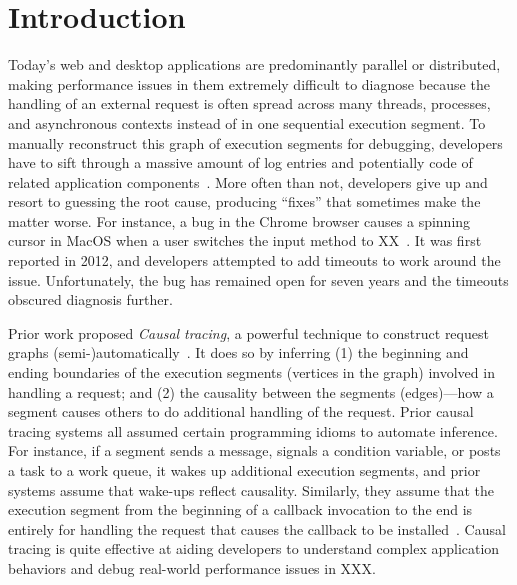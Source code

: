 \section{Introduction} \label{sec:intro}
%

%

Today's web and desktop applications are predominantly parallel or
distributed, making performance issues in them extremely difficult to
diagnose because the handling of an external request is often spread
across many threads, processes, and asynchronous
contexts
instead of in one
sequential execution segment.  To manually reconstruct this graph of
execution segments for debugging, developers have to sift through a
massive amount of log entries and potentially code of related application
components~\cite{luXXXXX}.  More often than not, developers give up and resort to
guessing the root cause, producing ``fixes'' that sometimes make the matter
worse.  For instance, a bug in the Chrome browser causes a spinning cursor
in MacOS when a user switches the input method to XX~\cite{bug-url}.  It
was first reported in 2012, and developers attempted to add timeouts
to work around the issue.  Unfortunately, the bug has remained 
open for seven years and the timeouts obscured diagnosis further.

Prior work proposed \emph{Causal tracing}, a powerful technique to
construct request graphs (semi-)automatically~\cite{xxx}. It does so by
inferring (1) the beginning and ending boundaries of the execution
segments (vertices in the graph) involved in handling a request; and (2)
the causality between the segments (edges)---how a segment causes others
to do additional handling of the request.  Prior causal tracing systems
all assumed certain programming idioms to automate inference.  For
instance, if a segment sends a message, signals a condition variable, or
posts a task to a work queue, it wakes up additional execution segments,
and prior systems assume that wake-ups reflect causality.  Similarly, they
assume that the execution segment from the beginning of a callback
invocation to the end is entirely for handling the request that causes the
callback to be installed~\cite{}.  Causal tracing is quite effective at
aiding developers to understand complex application behaviors and debug
real-world performance issues in XXX.

